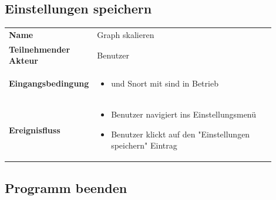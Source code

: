 \subsection{Einstellungen speichern}

\begin{tabular}{lp{0.9\linewidth}}
\textbf{Name} & Graph skalieren \\

\textbf{Teilnehmender Akteur} & Benutzer \\

\textbf{Eingangsbedingung} &
				\begin{minipage}[t]{\linewidth}
				\begin{itemize}[nosep,after=\strut,leftmargin=10pt]

				\item \programname und Snort mit \sppname sind in Betrieb

				\end{itemize}
				\end{minipage} \\
\textbf{Ereignisfluss} &
				\begin{minipage}[t]{\linewidth}
				\begin{itemize}[nosep,after=\strut,leftmargin=10pt]
				\item Benutzer navigiert ins Einstellungsmenü
				\item Benutzer klickt auf den "Einstellungen speichern" Eintrag
				\end{itemize}
				\end{minipage} \\
\end{tabular}

\subsection{Programm beenden}

